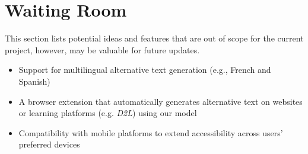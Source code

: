 \documentclass[12pt]{article}
\begin{document}
\section{Waiting Room}
This section lists potential ideas and features that are out of scope
for the current project, however, may be valuable for future updates.
\begin{itemize}
  \item Support for multilingual alternative text generation (e.g.,
    French and Spanish)
  \item A browser extension that automatically generates alternative
    text on websites or learning platforms (e.g. \textit{D2L}) using our model
  \item Compatibility with mobile platforms to extend accessibility
    across users' preferred devices
\end{itemize}
\end{document}
